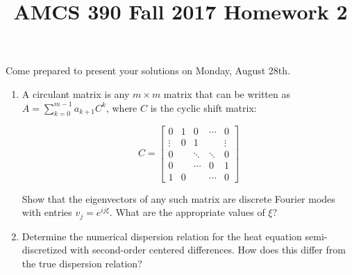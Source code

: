 \documentclass[12pt]{article}
\title{AMCS 390 Fall 2017 Homework 2}
\begin{document}
\date{}
\maketitle

Come prepared to present your solutions on Monday, August 28th.
\begin{enumerate}

    \item   A circulant matrix is any $m\times m$ matrix that can be written as
            $A=\sum_{k=0}^{m-1} a_{k+1}C^k$, where $C$ is the cyclic shift matrix:

            $$C = \begin{bmatrix} 0 & 1 & 0 & \cdots & 0 \\ \vdots & 0 & 1 & & \vdots \\
              0 & & \ddots & \ddots & 0  \\ 0 & & \cdots & 0 & 1\\ 1 & 0 & & \cdots & 0\end{bmatrix}$$

            Show that the eigenvectors of any such matrix are discrete Fourier modes
            with entries $v_j = e^{ij\xi}$.  What are the appropriate values of $\xi$?

    \item   Determine the numerical dispersion relation for the heat equation semi-discretized with
            second-order centered differences.  How does this differ from the true dispersion
            relation?

\end{enumerate}
\end{document}
